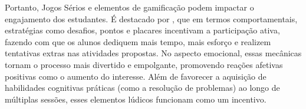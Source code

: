 \newpage{}


Portanto, Jogos Sérios e elementos de gamificação podem impactar o engajamento
dos estudantes. É destacado por \cite{silpasuwanchai2016developing}, que em
termos comportamentais, estratégias como desafios, pontos e placares incentivam
a participação ativa, fazendo com que os alunos dediquem mais tempo, mais
esforço e realizem tentativas extras nas atividades propostas. No aspecto
emocional, essas mecânicas tornam o processo mais divertido e empolgante,
promovendo reações afetivas positivas como o aumento do interesse. Além de
favorecer a aquisição de habilidades cognitivas práticas (como a resolução de
problemas) ao longo de múltiplas sessões, esses elementos lúdicos funcionam como
um incentivo.